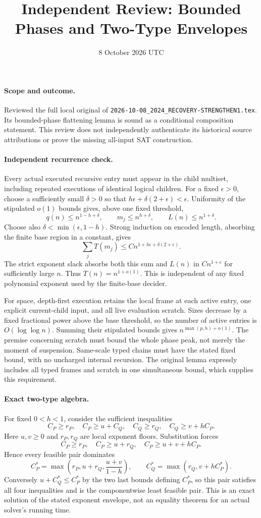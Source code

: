 \documentclass[11pt]{article}
\title{Independent Review: Bounded Phases and Two-Type Envelopes}
\date{8 October 2026 UTC}
\begin{document}
\maketitle
\paragraph{Scope and outcome.}
Reviewed the full local original of
\nolinkurl{2026-10-08_2024_RECOVERY-STRENGTHEN1.tex}.
Its bounded-phase flattening lemma is sound as a conditional composition
statement. This review does not independently authenticate its historical
source attributions or prove the missing all-input SAT construction.

\paragraph{Independent recurrence check.}
Every actual executed recursive entry must appear in the child multiset,
including repeated executions of identical logical children. For a fixed
$\epsilon>0$, choose a sufficiently small $\delta>0$ so that
$h\epsilon+\delta(2+\epsilon)<\epsilon$. Uniformity of the stipulated
$o(1)$ bounds gives, above one fixed threshold,
\[
 q(n)\le n^{1-h+\delta},\qquad
 m_j\le n^{h+\delta},\qquad L(n)\le n^{1+\delta}.
\]
Choose also $\delta<\min(\epsilon,1-h)$. Strong induction on encoded
length, absorbing the finite base region in a constant, gives
\[
 \sum_j T(m_j)\le C n^{1+h\epsilon+\delta(2+\epsilon)}.
\]
The strict exponent slack absorbs both this sum and $L(n)$ in
$Cn^{1+\epsilon}$ for sufficiently large $n$. Thus $T(n)=n^{1+o(1)}$.
This is independent of any fixed polynomial exponent used by the finite-base
decider.

For space, depth-first execution retains the local frame at each active
entry, one explicit current-child input, and all live evaluation scratch.
Sizes decrease by a fixed fractional power above the base threshold, so the
number of active entries is $O(\log\log n)$. Summing their stipulated bounds
gives $n^{\max(p,h)+o(1)}$. The premise concerning scratch must bound the
whole phase peak, not merely the moment of suspension. Same-scale typed
chains must have the stated fixed bound, with no uncharged internal recursion.
The original lemma expressly includes all typed frames and scratch in one
simultaneous bound, which supplies this requirement.

\paragraph{Exact two-type algebra.}
For fixed $0<h<1$, consider the sufficient inequalities
\[
 C_P\ge r_P,\quad C_P\ge u+C_Q,\quad
 C_Q\ge r_Q,\quad C_Q\ge v+hC_P.
\]
Here $u,v\ge0$ and $r_P,r_Q$ are local exponent floors. Substitution forces
\[
 C_P\ge r_P,\quad C_P\ge u+r_Q,\quad
 C_P\ge u+v+hC_P.
\]
Hence every feasible pair dominates
\[
 C_P^*=\max\left(r_P,u+r_Q,\frac{u+v}{1-h}\right),\qquad
 C_Q^*=\max(r_Q,v+hC_P^*).
\]
Conversely $u+C_Q^*\le C_P^*$ by the two last bounds defining $C_P^*$,
so this pair satisfies all four inequalities and is the componentwise least
feasible pair. This is an exact solution of the stated exponent envelope,
not an equality theorem for an actual solver's running time.
\end{document}
